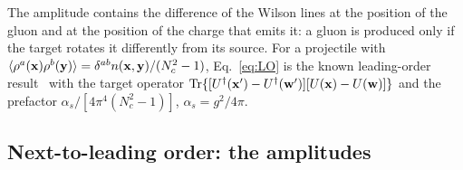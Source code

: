 The amplitude contains the difference of the Wilson lines at the position of the gluon and at the position of the charge that emits it: a gluon is produced only if the target rotates it differently from its source. For a projectile with $\langle\rho^a(\mathbf{x})\rho^b(\mathbf{y})\rangle=\delta^{ab}n(\mathbf{x},\mathbf{y})/(N_c^2-1)$, Eq.~\eqref{eq:LO} is the known leading-order result~\cite{Kovchegov:2001sc,Kovner:2006wr} with the target operator ${\rm Tr}\{[U^\dagger(\mathbf{x}')-U^\dagger(\mathbf{w}')][U(\mathbf{x})-U(\mathbf{w})]\}$ and the prefactor $\alpha_s/[4\pi^4(N_c^2-1)]$, $\alpha_s=g^2/4\pi$.

\subsection{Next-to-leading order: the amplitudes}\label{sec:NLOamplitudes}

